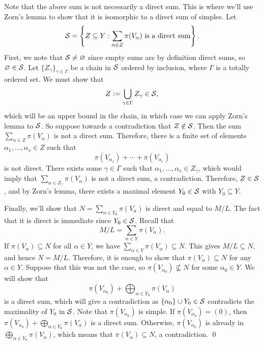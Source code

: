 \begin{enumerate}[(1)]
    Note that the above sum is not necessarily a direct sum. This is where 
    we'll use Zorn's lemma to show that it is isomorphic to a direct sum of 
    simples. Let 
    \[ {\cal S} = \left\{Z \subseteq Y : \sum_{\alpha \in Z} \pi(V_\alpha) 
    \text{ is a direct sum} \right\}. \] 
    First, we note that ${\cal S} \neq \varnothing$ since empty sums are 
    by definition direct sums, so $\varnothing \in {\cal S}$. Let 
    $\{Z_\gamma\}_{\gamma \in \Gamma}$ be a chain in ${\cal S}$ ordered by 
    inclusion, where $\Gamma$ is a totally ordered set. We must show that 
    \[ Z := \bigcup_{\gamma \in \Gamma} Z_\gamma \in {\cal S}, \] 
    which will be an upper bound in the chain, in which case we can apply 
    Zorn's lemma to ${\cal S}$. So suppose towards a contradiction that 
    $Z \notin {\cal S}$. Then the sum $\sum_{\alpha \in Z} \pi(V_\alpha)$ 
    is not a direct sum. Therefore, there is a finite set of elements 
    $\alpha_1, \dots, \alpha_s \in Z$ such that 
    \[ \pi(V_{\alpha_1}) + \cdots + \pi(V_{\alpha_s}) \] 
    is not direct. There exists some $\gamma \in \Gamma$ such that 
    $\alpha_1, \dots, \alpha_s \in Z_\gamma$, which would imply that 
    $\sum_{\alpha \in Z_\gamma} \pi(V_\alpha)$ is not a direct sum, a contradiction. 
    Therefore, $Z \in {\cal S}$, and by Zorn's lemma, there exists a maximal 
    element $Y_0 \in {\cal S}$ with $Y_0 \subseteq Y$. 

    Finally, we'll show that $N = \sum_{\alpha \in Y_0} \pi(V_\alpha)$ is 
    direct and equal to $M/L$. The fact that it is direct is immediate since 
    $Y_0 \in {\cal S}$. Recall that 
    \[ M/L = \sum_{\alpha \in Y} \pi(V_\alpha). \] 
    If $\pi(V_\alpha) \subseteq N$ for all $\alpha \in Y$, we have 
    $\sum_{\alpha \in Y} \pi(V_\alpha) \subseteq N$. This gives $M/L \subseteq N$, 
    and hence $N = M/L$. Therefore, it is enough to show that $\pi(V_\alpha) 
    \subseteq N$ for any $\alpha \in Y$. Suppose that this was not the case, 
    so $\pi(V_{\alpha_0}) \not\subseteq N$ for some $\alpha_0 \in Y$. 
    We will show that 
    \[ \pi(V_{\alpha_0}) + \bigoplus_{\alpha \in Y_0} \pi(V_\alpha) \] 
    is a direct sum, which will give a contradiction as $\{\alpha_0\} 
    \cup Y_0 \in {\cal S}$ contradicts the maximality of $Y_0$ in ${\cal S}$. 
    Note that $\pi(V_{\alpha_0})$ is simple. If $\pi(V_{\alpha_0}) = (0)$, then 
    $\pi(V_{\alpha_0}) + \bigoplus_{\alpha \in Y_0} \pi(V_\alpha)$ is a direct 
    sum. Otherwise, $\pi(V_{\alpha_0})$ is already in 
    $\bigoplus_{\alpha \in Y_0} \pi(V_\alpha)$, which means that 
    $\pi(V_\alpha) \subseteq N$, a contradiction. \qed 
\end{enumerate}